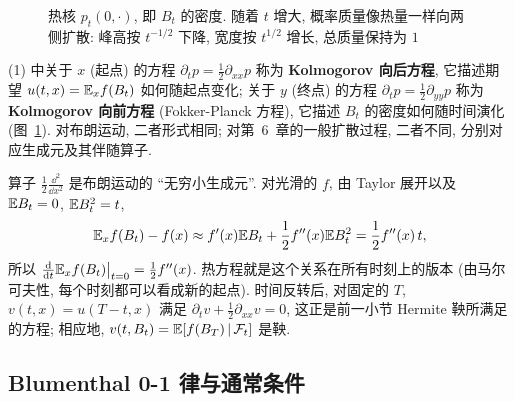 \begin{figure}[htbp]
\centering
{}
\caption{热核 $p_t(0,\cdot)$, 即 $B_t$ 的密度. 随着 $t$ 增大, 概率质量像热量一样向两侧扩散: 峰高按 $t^{-1/2}$ 下降, 宽度按 $t^{1/2}$ 增长, 总质量保持为 $1$}
\label{fig:heat-kernel}
\end{figure}

\begin{remark}[向后方程与向前方程]
(1) 中关于 $x$ (起点) 的方程 $\partial_tp=\frac{1}{2}\partial_{xx}p$ 称为 \textbf{Kolmogorov 向后方程}, 它描述期望 $u(t,x)=\mathbb{E}_x f(B_t)$ 如何随起点变化; 关于 $y$ (终点) 的方程 $\partial_tp=\frac{1}{2}\partial_{yy}p$ 称为 \textbf{Kolmogorov 向前方程} (Fokker-Planck 方程), 它描述 $B_t$ 的密度如何随时间演化 (图~\ref{fig:heat-kernel}). 对布朗运动, 二者形式相同; 对第~6~章的一般扩散过程, 二者不同, 分别对应生成元及其伴随算子.
\end{remark}

\begin{intuition}
算子 $\frac{1}{2}\frac{\dd^2}{\dd x^2}$ 是布朗运动的 ``无穷小生成元''. 对光滑的 $f$, 由 Taylor 展开以及 $\mathbb{E} B_t=0$, $\mathbb{E} B_t^2=t$,
\[
\mathbb{E}_x f(B_t)-f(x)\approx f'(x)\mathbb{E} B_t+\frac{1}{2}f''(x)\mathbb{E} B_t^2=\frac{1}{2}f''(x)\,t,
\]
所以 $\frac{\mathop{}\!\mathrm{d}}{\mathop{}\!\mathrm{d} t}\mathbb{E}_xf(B_t)\big|_{t=0}=\frac{1}{2}f''(x)$. 热方程就是这个关系在所有时刻上的版本 (由马尔可夫性, 每个时刻都可以看成新的起点). 时间反转后, 对固定的 $T$, $v(t,x)=u(T-t,x)$ 满足 $\partial_tv+\frac{1}{2}\partial_{xx}v=0$, 这正是前一小节 Hermite 鞅所满足的方程; 相应地, $v(t,B_t)=\mathbb{E}[f(B_T)\,|\,\mathcal{F}_t]$ 是鞅.
\end{intuition}

\subsection{Blumenthal 0-1 律与通常条件}

